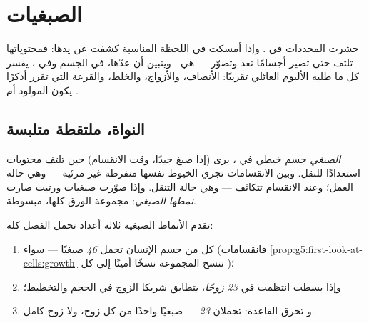 \chapter{الصبغيات}\label{ch:g9:chromosomes}

حشرت  المحددات
في . وإذا أمسكت  في اللحظة المناسبة كشفت
 عن يدها: فمحتوياتها تلتف حتى تصير أجسامًا تعد
وتصوّر --- هي . ويتبين أن عدّها، في  الجسم
وفي ، يفسر كل ما طلبه الألبوم العائلي تقريبًا:
الأنصاف، والأزواج، والخلط، والقرعة التي تقرر أذكرًا يكون
المولود أم .

\section{النواة، ملتقطة متلبسة}

\begin{definition}[الصبغيات]\label{def:g9:chromosomes:chromosomes}
\emph{الصبغي} جسم خيطي في ، يرى (إذا
صبغ جيدًا، وقت الانقسام) حين تلتف محتويات 
استعدادًا للنقل. وبين الانقسامات تجري الخيوط نفسها
منفرطة غير مرئية --- وهي حالة العمل؛ وعند الانقسام
تتكاثف --- وهي حالة التنقل. وإذا صوّرت صبغيات  ورتبت
صارت \emph{نمطها الصبغي}: مجموعة الورق
كلها، مبسوطة.
\end{definition}

\begin{proposition}\label{prop:g9:chromosomes:counts}
تقدم الأنماط الصبغية ثلاثة أعداد تحمل الفصل كله:
\begin{enumerate}
  \item كل  من  جسم الإنسان تحمل \emph{46}
        صبغيًا ---    سواء (فانقسامات
        \cref{prop:g5:first-look-at-cells:growth} تنسخ
        المجموعة نسخًا أمينًا إلى كل )؛
  \item وإذا بسطت انتظمت في \emph{23 زوجًا}، يتطابق
        شريكا الزوج في الحجم والتخطيط؛
  \item و\emph{} تخرق القاعدة:  
        تحملان \emph{23} --- صبغيًا واحدًا من كل زوج، ولا
        زوج كامل.
\end{enumerate}
\end{proposition}
\admitted

